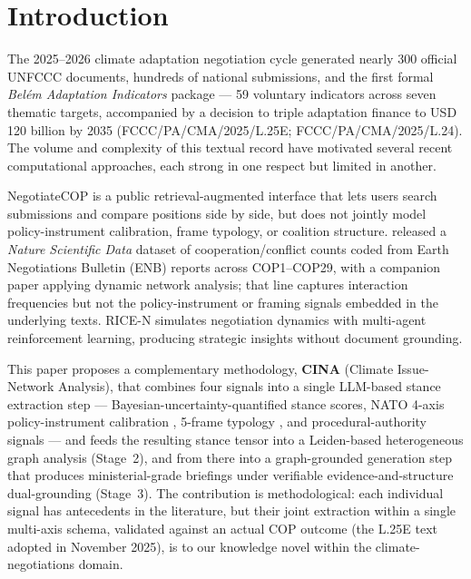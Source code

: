 \documentclass[11pt,a4paper]{article}
\begin{document}
\begin{abstract}
pre-registered for COP31, with code freeze planned for 2026-09-01.

\vspace{0.5em}
\noindent\textbf{Keywords}: climate negotiations, large language models, graph neural networks, regime complex theory, two-level games, instrument calibration, COP30, adaptation, Korea, Brazil, cross-provider reliability
\end{abstract}

\section{Introduction}
\label{sec:intro}

The 2025--2026 climate adaptation negotiation cycle generated nearly 300 official UNFCCC documents, hundreds of national submissions, and the first formal \emph{Belém Adaptation Indicators} package --- 59 voluntary indicators across seven thematic targets, accompanied by a decision to triple adaptation finance to USD 120 billion by 2035 (FCCC/PA/CMA/2025/L.25E; FCCC/PA/CMA/2025/L.24). The volume and complexity of this textual record have motivated several recent computational approaches, each strong in one respect but limited in another.

NegotiateCOP \citep{giz2025} is a public retrieval-augmented interface that lets users search submissions and compare positions side by side, but does not jointly model policy-instrument calibration, frame typology, or coalition structure. \citet{castro2025nature} released a \emph{Nature Scientific Data} dataset of cooperation/conflict counts coded from Earth Negotiations Bulletin (ENB) reports across COP1--COP29, with a companion paper \citep{castro2025envsoc} applying dynamic network analysis; that line captures interaction frequencies but not the policy-instrument or framing signals embedded in the underlying texts. RICE-N \citep{zhang2025} simulates negotiation dynamics with multi-agent reinforcement learning, producing strategic insights without document grounding.

This paper proposes a complementary methodology, \textbf{CINA} (Climate Issue-Network Analysis), that combines four signals into a single LLM-based stance extraction step --- Bayesian-uncertainty-quantified stance scores, NATO 4-axis policy-instrument calibration \citep{hood1983,howlett2019,capano2025}, 5-frame typology \citep{snow1988}, and procedural-authority signals \citep{tallberg2010} --- and feeds the resulting stance tensor into a Leiden-based heterogeneous graph analysis (Stage~2), and from there into a graph-grounded generation step that produces ministerial-grade briefings under verifiable evidence-and-structure dual-grounding (Stage~3). The contribution is methodological: each individual signal has antecedents in the literature, but their joint extraction within a single multi-axis schema, validated against an actual COP outcome (the L.25E text adopted in November 2025), is to our knowledge novel within the climate-negotiations domain.
\end{document}
